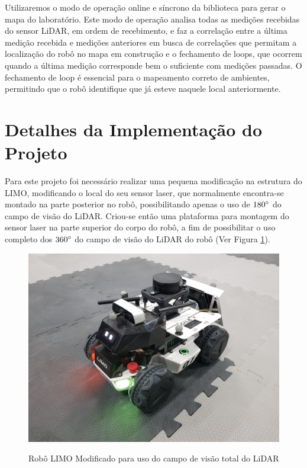     Utilizaremos o modo de operação online e síncrono da biblioteca para gerar o mapa do laboratório. Este modo de operação analisa todas as medições recebidas do sensor LiDAR, em ordem de recebimento, e faz a correlação entre a última medição recebida e medições anteriores em busca de correlações que permitam a localização do robô no mapa em construção e o fechamento de loops, que ocorrem quando a última medição corresponde bem o suficiente com medições passadas. O fechamento de loop é essencial para o mapeamento correto de ambientes, permitindo que o robô identifique que já esteve naquele local anteriormente.

    
    


    
\section{Detalhes da Implementação do Projeto}

    Para este projeto foi necessário realizar uma pequena modificação na estrutura do LIMO, modificando o local do seu sensor laser, que normalmente encontra-se montado na parte posterior no robô, possibilitando apenas o uso de $180\degree$ do campo de visão do LiDAR. Criou-se então uma plataforma para montagem do sensor laser na parte superior do corpo do robô, a fim de possibilitar o uso completo dos $360\degree$ do campo de visão do LiDAR do robô (Ver Figura \ref{fig:LIMO_Experimento}). 

    \begin{figure}[htb]
        \centering
        \caption{Robô LIMO Modificado para uso do campo de visão total do LiDAR}
        \includegraphics[width=0.8\linewidth]{img/LIMO_EXPERIMENTO.jpg}
        \source
        \label{fig:LIMO_Experimento}
    \end{figure}

